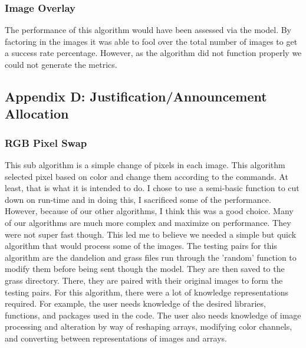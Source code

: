\documentclass{article}
\begin{document}
\subsubsection{Image Overlay}
The performance of this algorithm would have been assessed via the model. By factoring in the images it was able to fool over the total number of images to get a success rate percentage. However, as the algorithm did not function properly we could not generate the metrics. 

\subsection{Appendix D: Justification/Announcement Allocation}
\subsubsection{RGB Pixel Swap}
This sub algorithm is a simple change of pixels in each image. This algorithm selected pixel based on color and change them according to the commands. At least, that is what it is intended to do. I chose to use a semi-basic function to cut down on run-time and in doing this, I sacrificed some of the performance. However, because of our other algorithms, I think this was a good choice. Many of our algorithms are much more complex and maximize on performance. They were not super fast though. This led me to believe we needed a simple but quick algorithm that would process some of the images. The testing pairs for this algorithm are the dandelion and grass files run through the 'random' function to modify them before being sent though the model. They are then saved to the grass directory. There, they are paired with their original images to form the testing pairs. For this algorithm, there were a lot of knowledge representations required. For example, the user needs knowledge of the desired libraries, functions, and packages used in the code. The user also needs knowledge of image processing and alteration by way of reshaping arrays, modifying color channels, and converting between representations of images and arrays. 
\end{document}
